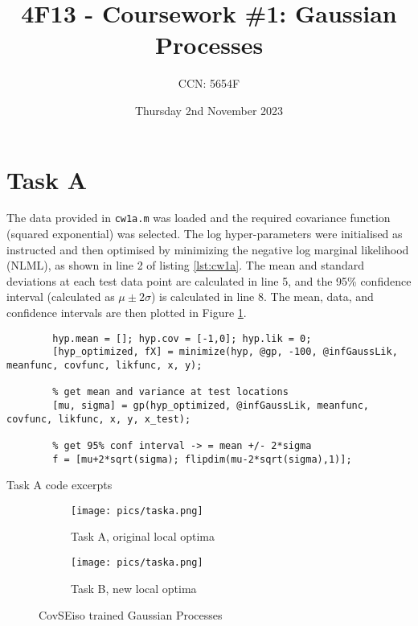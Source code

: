 \documentclass[11pt]{amsart}
\title[4F13 - Coursework \#1: Gaussian Processes]{4F13 - Coursework \#1: Gaussian Processes}
\author{CCN: 5654F}
\date{Thursday 2nd November 2023} %
\begin{document}
\maketitle

\section{Task A}
The data provided in \verb|cw1a.m| was loaded and the required covariance function (squared exponential) was selected. The log hyper-parameters were initialised as instructed and then optimised by minimizing the negative log marginal likelihood (NLML), as shown in line 2 of listing \ref{lst:cw1a}. The mean and standard deviations at each test data point are calculated in line 5, and the 95\% confidence interval (calculated as $\mu \pm 2\sigma$) is calculated in line 8. The mean, data, and confidence intervals are then plotted in Figure \ref{fig:taska}. 

\begin{listing}[H]
    \begin{verbatim}
        hyp.mean = []; hyp.cov = [-1,0]; hyp.lik = 0;
        [hyp_optimized, fX] = minimize(hyp, @gp, -100, @infGaussLik, meanfunc, covfunc, likfunc, x, y);
        
        % get mean and variance at test locations
        [mu, sigma] = gp(hyp_optimized, @infGaussLik, meanfunc, covfunc, likfunc, x, y, x_test);   

        % get 95% conf interval -> = mean +/- 2*sigma
        f = [mu+2*sqrt(sigma); flipdim(mu-2*sqrt(sigma),1)]; 
    \end{verbatim}
    \caption{Task A code excerpts} \label{lst:cw1a}
\end{listing}

\begin{figure}[ht]
  \centering
  \begin{subfigure}[b]{0.49\textwidth}
    \centering
    \texttt{[image: pics/taska.png]}
    \caption{Task A, original local optima}
    \label{fig:taska}
  \end{subfigure}
  \hfill
  \begin{subfigure}[b]{0.49\textwidth}
      \centering
      \texttt{[image: pics/taska.png]}
    \caption{Task B, new local optima}
    \label{fig:taskb}
    \end{subfigure}
    \caption{CovSEiso trained Gaussian Processes}
\end{figure} \label{fig:taskab}
\end{document}
